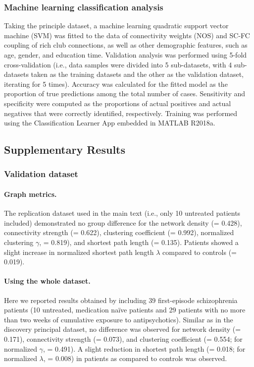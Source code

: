 \begin{refsection}
\subsubsection*{Machine learning classification analysis}
Taking the principle dataset, a machine learning quadratic support vector machine (SVM) was fitted to the data of connectivity weights (NOS) and SC-FC coupling of rich club connections, as well as other demographic features, such as age, gender, and education time. Validation analysis was performed using 5-fold cross-validation (i.e., data samples were divided into 5 sub-datasets, with 4 sub-datasets taken as the training datasets and the other as the validation dataset, iterating for 5 times). Accuracy was calculated for the fitted model as the proportion of true predictions among the total number of cases. Sensitivity and specificity were computed as the proportions of actual positives and actual negatives that were correctly identified, respectively. Training was performed using the Classification Learner App embedded in MATLAB R2018a.

\subsection*{Supplementary Results}
\subsubsection*{Validation dataset}
\paragraph{Graph metrics.} 
The replication dataset used in the main text (i.e., only 10 untreated patients included) demonstrated no group difference for the network density (\pval = 0.428), connectivity strength (\pval = 0.622), clustering coefficient (\pval = 0.992), normalized clustering $\gamma$, \pval = 0.819), and shortest path length (\pval = 0.135). Patients showed a slight increase in normalized shortest path length $\lambda$ compared to controls (\pval = 0.019).

\paragraph{Using the whole dataset.} 
Here we reported results obtained by including 39 first-episode schizophrenia patients (10 untreated, medication na\"{i}ve patients and 29 patients with no more than two weeks of cumulative exposure to antipsychotics). Similar as in the discovery principal dataset, no difference was observed for network density (\pval = 0.171), connectivity strength (\pval = 0.073), and clustering coefficient (\pval = 0.554; for normalized $\gamma$, \pval = 0.491). A slight reduction in shortest path length (\pval = 0.018; for normalized $\lambda$, \pval = 0.008) in patients as compared to controls was observed.


\end{refsection}
